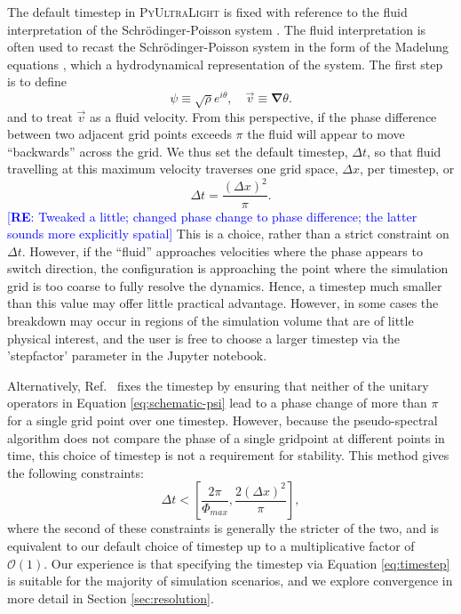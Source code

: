 \documentclass[a4paper,11pt]{article}
\newcommand{\re}[1]{\textcolor{blue}{[{\bf RE}: #1]}}
\newcommand{\PyUltraLight}{\textsc{PyUltraLight}\xspace}
\begin{document}
The default timestep in  \PyUltraLight  is fixed with reference to the fluid interpretation of the Schr{\"o}dinger-Poisson system \cite{Hui:2016ltb}. The fluid interpretation is often used to recast the Schr{\"o}dinger-Poisson system in the form of the Madelung equations \cite{Suarez:2011yf}, which a hydrodynamical representation of the system. The first step is to define
\begin{equation}\label{eq:madelung}
    \psi\equiv\sqrt{\rho}e^{i\theta}, \quad \vec{v}\equiv\boldsymbol{\nabla}\theta.
\end{equation}
and to treat $\vec{v}$ as a fluid velocity.  From this perspective, if the phase difference between two adjacent grid points exceeds $\pi$ the fluid will appear to move ``backwards'' across the grid. We thus set the default timestep, $\Delta t$, so that fluid travelling at this maximum velocity traverses one grid space, $\Delta x$, per timestep, or
\begin{equation}\label{eq:timestep}
    \Delta t = \frac{(\Delta x)^2}{\pi}.
\end{equation}
\re{Tweaked a little; changed phase change to phase difference; the latter sounds more explicitly spatial}
This is a choice, rather than a strict constraint on $\Delta t$. However, if the ``fluid'' approaches velocities where the phase appears to switch direction, the configuration is approaching the point where the simulation grid is too coarse to fully resolve the dynamics. Hence, a timestep much smaller than this value may offer little practical advantage. However, in some cases the breakdown may occur in regions of the simulation volume that are of little physical interest, and the user is free to choose a larger timestep  via the 'step\textunderscore factor' parameter in the Jupyter notebook.

Alternatively, Ref.~\cite{Mocz:2017wlg} fixes the timestep by ensuring that neither of the unitary operators in Equation \ref{eq:schematic-psi}  lead to a phase change of more than $\pi$ for a single grid point over one timestep. However, because the pseudo-spectral algorithm does not compare the phase of a single gridpoint at different points in time, this choice of timestep is not a requirement for stability. This method gives the following constraints: 
\begin{equation}
    \Delta t < \left[\frac{2\pi}{\Phi_{max}}, \frac{2(\Delta x)^2}{\pi}\right],
\end{equation}
%
where the second of these constraints is generally the stricter of the two, and is equivalent to our default choice of timestep up to a multiplicative factor of $\mathcal{O}(1)$. Our experience is that specifying the timestep via Equation \ref{eq:timestep} is suitable for the majority of simulation scenarios, and we explore convergence in more detail in Section \ref{sec:resolution}.
\end{document}
